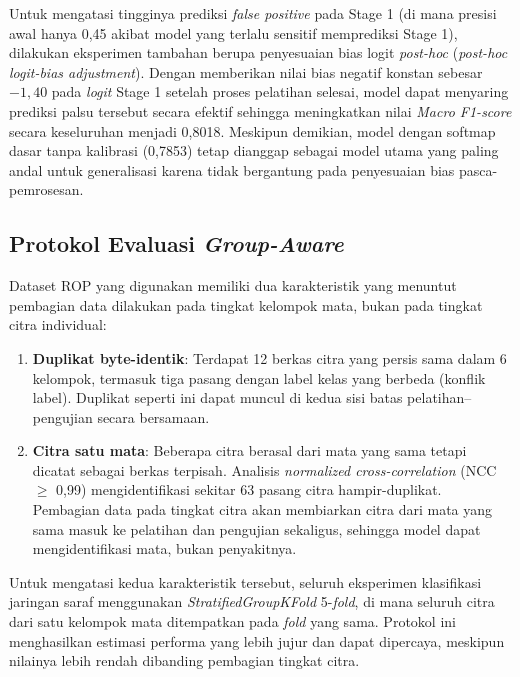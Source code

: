 Untuk mengatasi tingginya prediksi \textit{false positive} pada Stage 1 (di mana presisi awal hanya 0,45 akibat model yang terlalu sensitif memprediksi Stage 1), dilakukan eksperimen tambahan berupa penyesuaian bias logit \textit{post-hoc} (\textit{post-hoc logit-bias adjustment}). Dengan memberikan nilai bias negatif konstan sebesar $-1{,}40$ pada \textit{logit} Stage 1 setelah proses pelatihan selesai, model dapat menyaring prediksi palsu tersebut secara efektif sehingga meningkatkan nilai \textit{Macro F1-score} secara keseluruhan menjadi 0,8018. Meskipun demikian, model dengan softmap dasar tanpa kalibrasi (0,7853) tetap dianggap sebagai model utama yang paling andal untuk generalisasi karena tidak bergantung pada penyesuaian bias pasca-pemrosesan.

\subsection{Protokol Evaluasi \textit{Group-Aware}}
\label{subsec:group_aware}

Dataset ROP yang digunakan memiliki dua karakteristik yang
menuntut pembagian data dilakukan pada tingkat kelompok mata, bukan pada tingkat citra
individual:

\begin{enumerate}
    \item \textbf{Duplikat byte-identik}: Terdapat 12 berkas citra yang persis sama dalam 6
    kelompok, termasuk tiga pasang dengan label kelas yang berbeda (konflik label). Duplikat
    seperti ini dapat muncul di kedua sisi batas pelatihan--pengujian secara bersamaan.
    \item \textbf{Citra satu mata}: Beberapa citra berasal dari mata yang sama tetapi dicatat
    sebagai berkas terpisah. Analisis \textit{normalized cross-correlation} (NCC $\geq$ 0,99)
    mengidentifikasi sekitar 63 pasang citra hampir-duplikat. Pembagian data pada tingkat citra
    akan membiarkan citra dari mata yang sama masuk ke pelatihan dan pengujian sekaligus,
    sehingga model dapat mengidentifikasi mata, bukan penyakitnya.
\end{enumerate}

Untuk mengatasi kedua karakteristik tersebut, seluruh eksperimen klasifikasi jaringan saraf
menggunakan \textit{StratifiedGroupKFold} 5-\textit{fold}, di mana seluruh citra dari satu
kelompok mata ditempatkan pada \textit{fold} yang sama. Protokol ini menghasilkan estimasi
performa yang lebih jujur dan dapat dipercaya, meskipun nilainya lebih rendah
dibanding pembagian tingkat citra.

